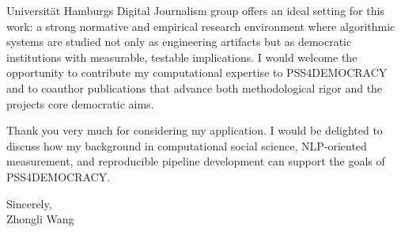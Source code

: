 \documentclass[11pt]{article}
\begin{document}
Universit\"at Hamburg\textquotesingle s Digital Journalism group offers an ideal setting for this work: a strong normative and empirical research environment where algorithmic systems are studied not only as engineering artifacts but as democratic institutions with measurable, testable implications. I would welcome the opportunity to contribute my computational expertise to PSS4DEMOCRACY and to coauthor publications that advance both methodological rigor and the project\textquotesingle s core democratic aims.

Thank you very much for considering my application. I would be delighted to discuss how my background in computational social science, NLP-oriented measurement, and reproducible pipeline development can support the goals of PSS4DEMOCRACY.

\vspace{6mm}

\noindent Sincerely,\\[12mm]
\noindent Zhongli Wang
\end{document}
